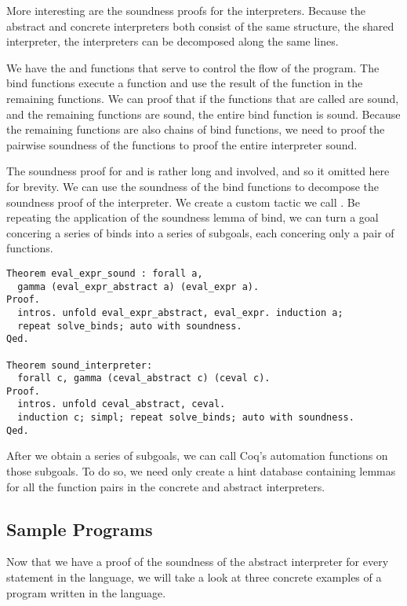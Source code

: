 More interesting are the soundness proofs for the interpreters. Because the
abstract and concrete interpreters both consist of the same structure, the
shared interpreter, the interpreters can be decomposed along the same lines.

We have the  and  functions that 
serve to control the flow of the program. The bind functions execute a function
and use the result of the function in the remaining functions. We can proof
that if the functions that are called are sound, and the remaining functions
are sound, the entire bind function is sound. Because the remaining functions
are also chains of bind functions, we need to proof the pairwise soundness of 
the functions to proof the entire interpreter sound.

The soundness proof for  and  is
rather long and involved, and so it omitted here for brevity. We can use the
soundness of the bind functions to decompose the soundness proof of the
interpreter. We create a custom tactic we call . Be repeating
the application of the soundness lemma of bind, we can turn a goal concering a
series of binds into a series of subgoals, each concering only a pair of
functions.

\begin{verbatim}
Theorem eval_expr_sound : forall a,
  gamma (eval_expr_abstract a) (eval_expr a).
Proof.
  intros. unfold eval_expr_abstract, eval_expr. induction a; 
  repeat solve_binds; auto with soundness. 
Qed.

Theorem sound_interpreter:
  forall c, gamma (ceval_abstract c) (ceval c).
Proof.
  intros. unfold ceval_abstract, ceval. 
  induction c; simpl; repeat solve_binds; auto with soundness.
Qed.
\end{verbatim}

After we obtain a series of subgoals, we can call Coq's automation functions on
those subgoals. To do so, we need only create a hint database containing lemmas
for all the function pairs in the concrete and abstract interpreters.

\subsection{Sample Programs}
Now that we have a proof of the soundness of the abstract interpreter for every
statement in the language, we will take a look at three concrete examples of a
program written in the language. 

